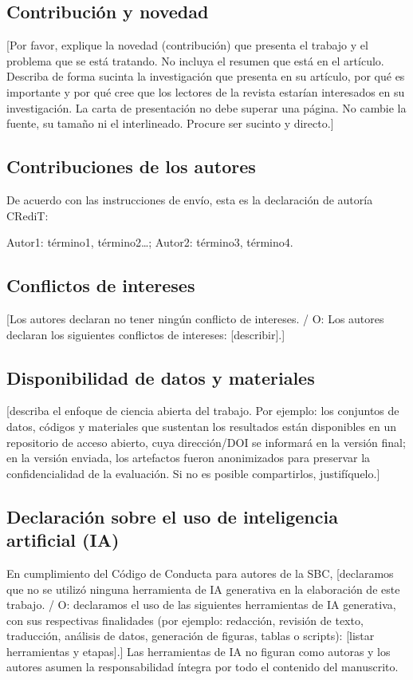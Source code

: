 \documentclass[11pt,a4paper,spanish]{article}
\begin{document}
\subsection*{Contribución y novedad}
[Por favor, explique la novedad (contribución) que presenta el trabajo y el problema que se está tratando. No incluya el resumen que está en el artículo. Describa de forma sucinta la investigación que presenta en su artículo, por qué es importante y por qué cree que los lectores de la revista estarían interesados en su investigación. La carta de presentación no debe superar una página. No cambie la fuente, su tamaño ni el interlineado. Procure ser sucinto y directo.]

\subsection*{Contribuciones de los autores}
De acuerdo con las instrucciones de envío, esta es la declaración de autoría CRediT:

Autor1: término1, término2\ldots; Autor2: término3, término4.

\subsection*{Conflictos de intereses}
[Los autores declaran no tener ningún conflicto de intereses. / O: Los autores declaran los siguientes conflictos de intereses: [describir].]

\subsection*{Disponibilidad de datos y materiales}
[describa el enfoque de ciencia abierta del trabajo. Por ejemplo: los conjuntos de datos, códigos y materiales que sustentan los resultados están disponibles en un repositorio de acceso abierto, cuya dirección/DOI se informará en la versión final; en la versión enviada, los artefactos fueron anonimizados para preservar la confidencialidad de la evaluación. Si no es posible compartirlos, justifíquelo.]

\subsection*{Declaración sobre el uso de inteligencia artificial (IA)}
En cumplimiento del Código de Conducta para autores de la SBC, [declaramos que no se utilizó ninguna herramienta de IA generativa en la elaboración de este trabajo. / O: declaramos el uso de las siguientes herramientas de IA generativa, con sus respectivas finalidades (por ejemplo: redacción, revisión de texto, traducción, análisis de datos, generación de figuras, tablas o scripts): [listar herramientas y etapas].] Las herramientas de IA no figuran como autoras y los autores asumen la responsabilidad íntegra por todo el contenido del manuscrito.
\end{document}
